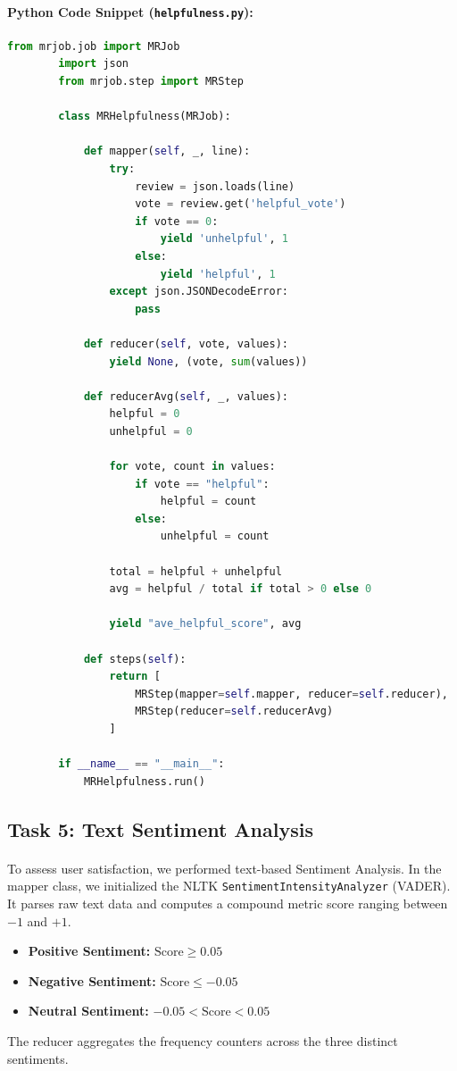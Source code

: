 \documentclass[12pt, a4paper]{article}
\begin{document}
	\paragraph{Python Code Snippet (\texttt{helpfulness.py}):}
	\begin{lstlisting}[language=Python, caption={Evaluating customer helpfulness ratios using multi-step execution.}]
		from mrjob.job import MRJob
		import json
		from mrjob.step import MRStep
		
		class MRHelpfulness(MRJob):
		
			def mapper(self, _, line):
				try:
					review = json.loads(line)
					vote = review.get('helpful_vote')
					if vote == 0:
						yield 'unhelpful', 1
					else:
						yield 'helpful', 1
				except json.JSONDecodeError:
					pass
			
			def reducer(self, vote, values):
				yield None, (vote, sum(values))
			
			def reducerAvg(self, _, values):
				helpful = 0
				unhelpful = 0
				
				for vote, count in values:
					if vote == "helpful":
						helpful = count
					else:
						unhelpful = count
				
				total = helpful + unhelpful
				avg = helpful / total if total > 0 else 0
				
				yield "ave_helpful_score", avg
			
			def steps(self):
				return [
					MRStep(mapper=self.mapper, reducer=self.reducer),
					MRStep(reducer=self.reducerAvg)       
				]
			
		if __name__ == "__main__":
			MRHelpfulness.run()
	\end{lstlisting}
	

	\subsection{Task 5: Text Sentiment Analysis}
	\paragraph{} 
	To assess user satisfaction, we performed text-based Sentiment Analysis. In the mapper class, we initialized the NLTK \texttt{SentimentIntensityAnalyzer} (VADER). It parses raw text data and computes a compound metric score ranging between $-1$ and $+1$. 
	\begin{itemize}
		\item \textbf{Positive Sentiment:} $\text{Score} \geq 0.05$
		\item \textbf{Negative Sentiment:} $\text{Score} \leq -0.05$
		\item \textbf{Neutral Sentiment:} $-0.05 < \text{Score} < 0.05$
	\end{itemize}
	The reducer aggregates the frequency counters across the three distinct sentiments.
	
\end{document}
